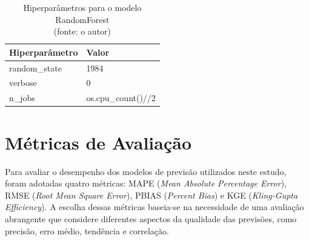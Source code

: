 \begin{table}[!h]
	\centering \small
	\caption{Hiperparâmetros para o modelo RandomForest\\(fonte: o autor)}
	\begin{tabular}{|l|l|} \hline 
		\textbf{Hiperparâmetro} & \textbf{Valor}     \\\hline
		random\_state           & 1984               \\\hline
		verbose                 & 0                  \\\hline
		n\_jobs                 & os.cpu\_count()//2 \\\hline
	\end{tabular}
	\label{tab:hiperparametros_randomforest}
\end{table}


\section{Métricas de Avaliação}

Para avaliar o desempenho dos modelos de previsão utilizados neste estudo, foram adotadas quatro métricas: MAPE (\textit{Mean Absolute Percentage Error}), RMSE (\textit{Root Mean Square Error}), PBIAS (\textit{Percent Bias}) e KGE (\textit{Kling-Gupta Efficiency}). A escolha dessas métricas baseia-se na necessidade de uma avaliação abrangente que considere diferentes aspectos da qualidade das previsões, como precisão, erro médio, tendência e correlação.

